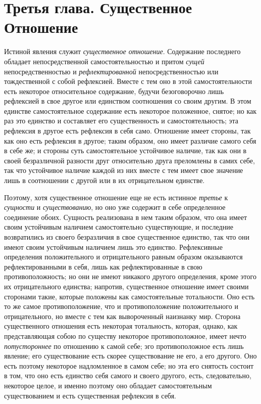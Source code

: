 \chapter[{\em Третья глава} Существенное Отношение]
{Третья глава. Существенное Отношение}

Истиной явления служит {\em существенное отношение}. Содержание последнего
обладает непосредственной самостоятельностью и притом
{\em сущей} непосредственностью и
{\em рефлектированной} непосредственностью или
тождественной с собой рефлексией. Вместе с тем оно в этой самостоятельности
есть некоторое относительное содержание, будучи безоговорочно лишь
рефлексией в свое другое или единством соотношения со своим другим. В этом
единстве самостоятельное содержание есть некоторое положенное, снятое; но
как раз это единство и составляет его существенность и самостоятельность;
эта рефлексия в другое есть рефлексия в себя само. Отношение имеет стороны,
так как оно есть рефлексия в другое; таким образом, оно имеет различие
самого себя в себе же; и стороны суть самостоятельное устойчивое наличие,
так как они в своей безразличной разности друг относительно друга
преломлены в самих себе, так что устойчивое наличие каждой из них вместе с
тем имеет свое значение лишь в соотношении с другой или в их отрицательном
единстве.

Поэтому, хотя существенное отношение еще не есть истинное
{\em третье} к {\em сущности} и
{\em существованию}, но оно уже содержит в себе
определенное соединение обоих. Сущность реализована в нем таким образом,
что она имеет своим устойчивым наличием самостоятельно существующие, и
последние возвратились из своего безразличия в свое существенное единство,
так что они имеют своим устойчивым наличием лишь это единство. Рефлексивные
определения положительного и отрицательного равным образом оказываются
рефлектированными в себя, лишь как рефлектированные в свою
противоположность; но они не имеют никакого другого определения, кроме
этого их отрицательного единства; напротив, существенное отношение имеет
своими сторонами такие, которые положены как самостоятельные тотальности.
Оно есть то же самое противоположение, что и противоположение
положительного и отрицательного, но вместе с тем как вывороченный наизнанку
мир. Сторона существенного отношения есть некоторая тотальность, которая,
однако, как представляющая собою по существу некоторое противоположное,
имеет нечто {\em потустороннее} по отношению к самой
себе; эго противоположное есть лишь явление; его существование есть скорее
существование не его, а его другого. Оно есть поэтому некоторое
надломленное в самом себе; но эта его снятость состоит в том, что оно есть
единство себя самого и своего другого, есть, следовательно, некоторое
целое, и именно поэтому оно обладает самостоятельным существованием и есть
существенная рефлексия в себя.

